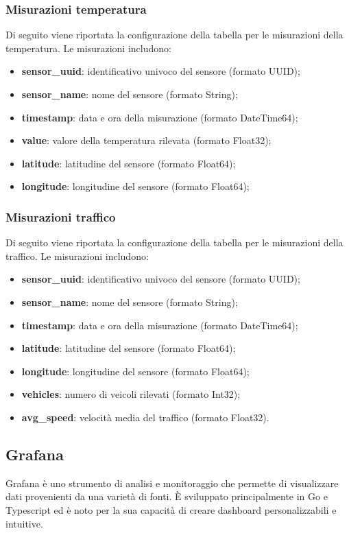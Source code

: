 \subsubsection{Misurazioni temperatura}
Di seguito viene riportata la configurazione della tabella per le misurazioni della temperatura. Le misurazioni includono:
\begin{itemize}
	\item \textbf{sensor\_uuid}: identificativo univoco del sensore (formato UUID);
	\item \textbf{sensor\_name}: nome del sensore (formato String);
	\item \textbf{timestamp}: data e ora della misurazione (formato DateTime64);
	\item \textbf{value}: valore della temperatura rilevata (formato Float32);
	\item \textbf{latitude}: latitudine del sensore (formato Float64);
	\item \textbf{longitude}: longitudine del sensore (formato Float64);
\end{itemize}
\subsubsection{Misurazioni traffico}
Di seguito viene riportata la configurazione della tabella per le misurazioni della traffico. Le misurazioni includono:
\begin{itemize}
	\item \textbf{sensor\_uuid}: identificativo univoco del sensore (formato UUID);
	\item \textbf{sensor\_name}: nome del sensore (formato String);
	\item \textbf{timestamp}: data e ora della misurazione (formato DateTime64);
	\item \textbf{latitude}: latitudine del sensore (formato Float64);
	\item \textbf{longitude}: longitudine del sensore (formato Float64);
	\item \textbf{vehicles}: numero di veicoli rilevati (formato Int32);
	\item \textbf{avg\_speed}: velocità media del traffico (formato Float32).
\end{itemize}
\subsection{Grafana}
Grafana è uno strumento di analisi e monitoraggio che permette di visualizzare dati provenienti da una varietà di fonti. È sviluppato principalmente in Go e Typescript ed è noto per la sua capacità di creare dashboard personalizzabili e intuitive.
